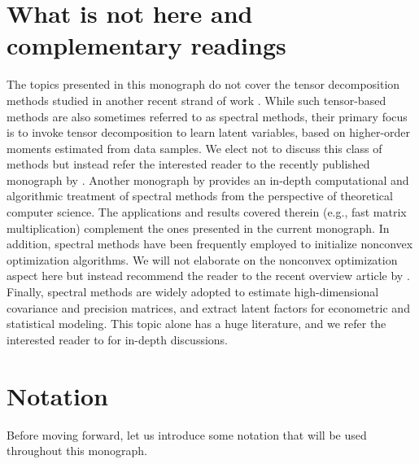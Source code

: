 \section{What is not here and complementary readings}



The topics presented in this monograph do not cover the tensor decomposition methods studied in another recent strand of work \citep{anandkumar2014tensor}.  While such tensor-based methods are also sometimes referred to as spectral methods, their primary focus is to invoke tensor decomposition to learn latent variables,  based on higher-order moments estimated from data samples.
We elect not to discuss this class of methods but instead refer the interested reader to the recently published monograph by \citet{MAL-057}.
Another monograph by \citet{kannan2009spectral} provides an in-depth computational and algorithmic treatment of spectral methods from the perspective of theoretical computer science.
The applications and results covered therein (e.g., fast matrix multiplication)  complement the ones presented in the current monograph.
In addition, spectral methods have been frequently employed to initialize nonconvex optimization algorithms. We will not elaborate on the nonconvex optimization aspect here but instead recommend the reader to the recent overview article by \citet{chi2019nonconvex}.  Finally, spectral methods are widely adopted to estimate high-dimensional covariance and precision matrices, and extract latent factors for econometric and statistical modeling. This topic alone has a huge literature, and we refer the interested reader to \citet{fan2020statistical} for in-depth discussions.





\section{Notation}

Before moving forward, let us introduce some notation that will be used throughout this monograph.


